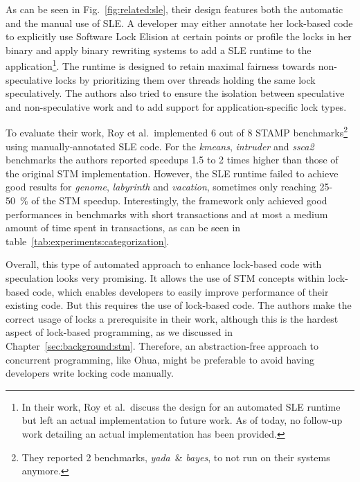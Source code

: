 As can be seen in Fig.~\ref{fig:related:sle}, their design features both the automatic and the manual use of SLE.
A developer may either annotate her lock-based code to explicitly use Software Lock Elision at certain points or profile the locks in her binary and apply binary rewriting systems to add a SLE runtime to the application\footnote{In their work, Roy et al.\ discuss the design for an automated SLE runtime but left an actual implementation to future work. As of today, no follow-up work detailing an actual implementation has been provided.}.
The runtime is designed to retain maximal fairness towards non-speculative locks by prioritizing them over threads holding the same lock speculatively.
The authors also tried to ensure the isolation between speculative and non-speculative work and to add support for application-specific lock types.

To evaluate their work, Roy et al.\ implemented 6 out of 8 STAMP benchmarks\footnote{They reported 2 benchmarks, \emph{yada}~\& \emph{bayes}, to not run on their systems anymore.} using manually-annotated SLE code.
For the \emph{kmeans}, \emph{intruder} and \emph{ssca2} benchmarks the authors reported speedups 1.5 to 2 times higher than those of the original STM implementation.
However, the SLE runtime failed to achieve good results for \emph{genome}, \emph{labyrinth} and \emph{vacation}, sometimes only reaching 25-50~\% of the STM speedup.
Interestingly, the framework only achieved good performances in benchmarks with short transactions and at most a medium amount of time spent in transactions, as can be seen in table~\ref{tab:experiments:categorization}.

Overall, this type of automated approach to enhance lock-based code with speculation looks very promising.
It allows the use of STM concepts within lock-based code, which enables developers to easily improve performance of their existing code.
But this requires the use of lock-based code.
The authors make the correct usage of locks a prerequisite in their work, although this is the hardest aspect of lock-based programming, as we discussed in Chapter~\ref{sec:background:stm}.
Therefore, an abstraction-free approach to concurrent programming, like Ohua, might be preferable to avoid having developers write locking code manually.

